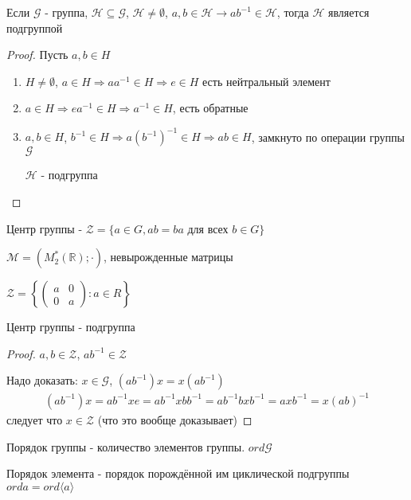 \documentclass[../main/document.tex]{subfiles}
\begin{document}
\begin{thm}\label{one-step-subgroup-test}
Если $\mathcal{G}$ - группа, $\mathcal{H}\subseteq \mathcal{G}$, $\mathcal{H}\neq \emptyset$, $a,b\in \mathcal{H}\rightarrow ab^{-1}\in \mathcal{H}$, тогда $\mathcal{H}$ является подгруппой
\begin{proof}
Пусть $a,b\in H$
\begin{enumerate}
\item $H\neq \emptyset$, $a\in H\Rightarrow aa^{-1}\in H\Rightarrow e\in H$ есть нейтральный элемент
\item $a\in H\Rightarrow ea^{-1}\in H\Rightarrow a^{-1}\in H$, есть обратные
\item $a,b\in H$, $b^{-1}\in H\Rightarrow a(b^{-1})^{-1}\in H\Rightarrow ab\in H$, замкнуто по операции группы $\mathcal{G}$

$\mathcal{H}$ - подгруппа 
\end{enumerate}
\end{proof}
\end{thm}

\begin{dfn}
Центр группы - $\mathcal{Z}=\{a\in G, ab=ba \text{ для всех } b\in G\}$
\end{dfn}
\begin{exm}
$\mathcal{M}=(M^*_2(\mathbb{R});\cdot)$, невырожденные матрицы

$\mathcal{Z}= \left\{
\begin{pmatrix}a&0\\0&a\end{pmatrix}:a\in R
\right\}$
\end{exm}
\begin{thm}
Центр группы - подгруппа
\begin{proof}
$a,b\in \mathcal{Z}$, $ab^{-1}\in \mathcal{Z}$

Надо доказать: $x\in \mathcal{G}$, $(ab^{-1})x=x(ab^{-1})$
\begin{multline*}
(ab^{-1})x=ab^{-1}xe=ab^{-1}xbb^{-1}=ab^{-1}bxb^{-1}=axb^{-1}=x(ab)^{-1}
\end{multline*}
следует что $x\in \mathcal{Z}$ (что это вообще доказывает)
\end{proof}
\end{thm}

\begin{dfn}
Порядок группы - количество элементов группы. $ord\mathcal{G}$
\end{dfn}
\begin{dfn}
Порядок элемента - порядок порождённой им циклической подгруппы $orda=ord\langle a\rangle$
\end{dfn}
\end{document}
